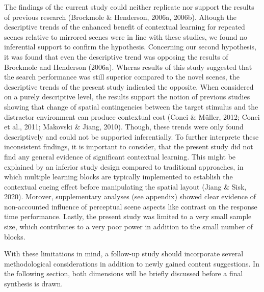 \documentclass[
  man,floatsintext]{apa7}
\begin{document}
The findings of the current study could neither replicate nor support the results of previous research (Brockmole \& Henderson, 2006a, 2006b). Altough the descriptive trends of the enhanced benefit of contextual learning for repeated scenes relative to mirrored scenes were in line with these studies, we found no inferential support to confirm the hypothesis. Concerning our second hypothesis, it was found that even the descriptive trend was opposing the results of Brockmole and Henderson (2006a). Wheras results of this study suggested that the search performance was still superior compared to the novel scenes, the descriptive trends of the present study indicated the opposite. When considered on a purely descriptive level, the results support the notion of previous studies showing that change of spatial contingencies between the target stimulus and the distractor environment can produce contextual cost (Conci \& Müller, 2012; Conci et al., 2011; Makovski \& Jiang, 2010). Though, these trends were only found descriptively and could not be supported inferentially. To further interprete these inconsistent findings, it is important to consider, that the present study did not find any general evidence of significant contextual learning. This might be explained by an inferior study design compared to traditional approaches, in which multiple learning blocks are typically implemented to establish the contextual cueing effect before manipulating the spatial layout (Jiang \& Sisk, 2020). Morover, supplementary analyses (see appendix) showed clear evidence of non-accounted influence of perceptual scene aspects like contrast on the response time performance. Lastly, the present study was limited to a very small sample size, which contributes to a very poor power in addition to the small number of blocks.

With these limitations in mind, a follow-up study should incorporate several methodological considerations in addition to newly gained content suggestions. In the following section, both dimensions will be briefly discussed before a final synthesis is drawn.
\end{document}

